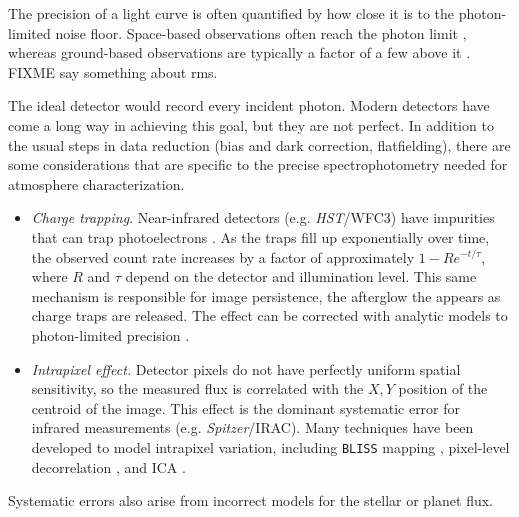 \documentclass[graybox,natbib,nosecnum]{svmult}
\newcommand{\project}[1]{\textsl{#1}}
\newcommand{\HST}{\project{HST}}
\newcommand{\Spitzer}{\project{Spitzer}}
\begin{document}
The precision of a light curve is often quantified by how close it is to the photon-limited noise floor. Space-based observations often reach the photon limit \citep{sing11, kreidberg14a, ingalls16}, whereas ground-based observations are typically a factor of a few above it \citep[e.g.][]{bean13}. FIXME say something about rms.

The ideal detector would record every incident photon.  Modern detectors have come a long way in achieving this goal, but they are not perfect.  In addition to the usual steps in data reduction (bias and dark correction, flatfielding), there are some considerations that are specific to the precise spectrophotometry needed for atmosphere characterization.

\begin{itemize}
\item{\emph{Charge trapping}. Near-infrared detectors (e.g. \HST/WFC3) have impurities that can trap photoelectrons \citep{smith08}. As the traps fill up exponentially over time, the observed count rate increases by a factor of approximately $1 - R e^{-t/\tau}$, where $R$ and $\tau$ depend on the detector and illumination level.  This same mechanism is responsible for image persistence, the afterglow the appears as charge traps are released. The effect can be corrected with analytic models to photon-limited precision \citep{deming13, line16}. 
}
\item{\emph{Intrapixel effect.} Detector pixels do not have perfectly uniform spatial sensitivity, so the measured flux is correlated with the $X, Y$ position of the centroid of the image. This effect is the dominant systematic error for infrared measurements (e.g. \Spitzer/IRAC). Many techniques have been developed to model intrapixel variation, including \texttt{BLISS} mapping \citep{stevenson12}, pixel-level decorrelation \citep{deming15}, and ICA \citep{morello15}.}
\end{itemize}

Systematic errors also arise from incorrect models for the stellar or planet flux. 
\end{document}
